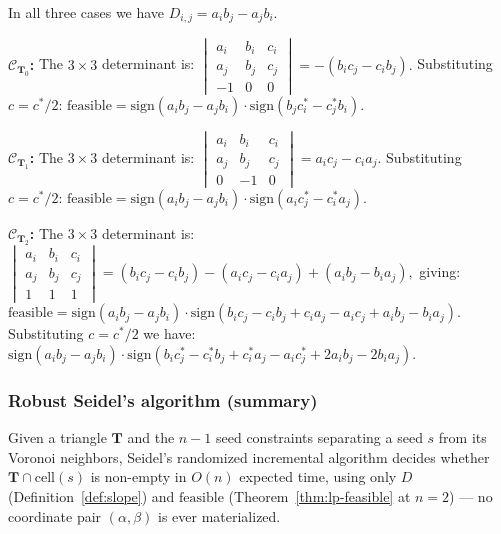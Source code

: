 \documentclass[12pt]{article}
\makeatletter
\theoremstyle{definition}
\theoremstyle{remark}
\renewenvironment{proof}[1][\proofname]{\par
  \pushQED{\qed}%
  \normalfont \footnotesize \topsep6\p@\@plus6\p@\relax
  \list{}{\leftmargin=2em
          \settowidth{\itemindent}{\itshape#1}%
          \labelwidth=\itemindent
          \parsep=0pt \listparindent=\parindent 
  }
  \item[\hskip\labelsep
        \itshape
    #1\@addpunct{.}]\ignorespaces
}{%
  \popQED\endlist\@endpefalse
}
\makeatother
\begin{document}
\begin{proof}
In all three cases we have $D_{i,j} = a_i b_j - a_j b_i$.

\noindent
\textbf{$\mathcal{C}_{\mathbf{T}_0}$:} The $3\times 3$ determinant is:
$
    \begin{vmatrix}
        a_i & b_i & c_i \\
        a_j & b_j & c_j \\
        -1  & 0   & 0
    \end{vmatrix} = -(b_i c_j - c_i b_j).
$
Substituting $c = c^*/2$:
$
    \mathrm{feasible} = \mathrm{sign}(a_i b_j - a_j b_i) \cdot \mathrm{sign}(b_j c_i^* - c_j^* b_i).
$

\bigskip\noindent
\textbf{$\mathcal{C}_{\mathbf{T}_1}$:} The $3\times 3$ determinant is:
$
    \begin{vmatrix}
        a_i & b_i & c_i \\
        a_j & b_j & c_j \\
        0   & -1  & 0
    \end{vmatrix} = a_i c_j - c_i a_j.
$
Substituting $c = c^*/2$:
$
    \mathrm{feasible} = \mathrm{sign}(a_i b_j - a_j b_i) \cdot \mathrm{sign}(a_i c_j^* - c_i^* a_j).
$

\bigskip\noindent
\textbf{$\mathcal{C}_{\mathbf{T}_2}$:} The $3\times 3$ determinant is:
$
    \begin{vmatrix}
        a_i & b_i & c_i \\
        a_j & b_j & c_j \\
        1   & 1   & 1
    \end{vmatrix} = (b_i c_j - c_i b_j) - (a_i c_j - c_i a_j) + (a_i b_j - b_i a_j),
$
giving:
$
    \mathrm{feasible} = \mathrm{sign}(a_i b_j - a_j b_i) \cdot \mathrm{sign}(b_i c_j - c_i b_j  + c_i a_j -a_i c_j + a_i b_j - b_i a_j)$. Substituting $c = c^*/2$ we have:
$
    \mathrm{sign}(a_i b_j - a_j b_i) \cdot \mathrm{sign}(b_i c^*_j -c^*_i b_j + c^*_i a_j - a_i c^*_j + 2a_i b_j - 2b_i a_j).
$
\end{proof}

\subsubsection*{Robust Seidel's algorithm (summary)}

Given a triangle $\mathbf T$ and the $n-1$ seed constraints separating a
seed $s$ from its Voronoi neighbors, Seidel's randomized incremental
algorithm decides whether $\mathbf T \cap \mathrm{cell}(s)$ is non-empty in
$O(n)$ expected time, using only $D$ (Definition~\ref{def:slope}) and
$\mathrm{feasible}$ (Theorem~\ref{thm:lp-feasible} at $n=2$) --- no
coordinate pair $(\alpha,\beta)$ is ever materialized.
\end{document}

